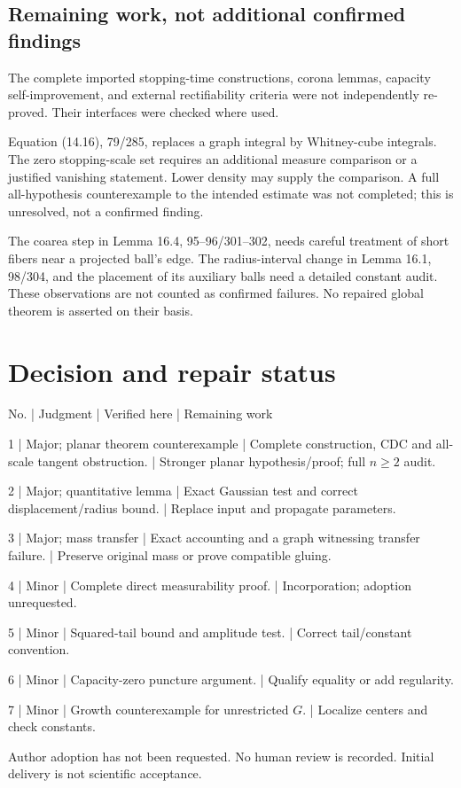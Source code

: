 \documentclass[10pt]{article}
\begin{document}
\subsection*{Remaining work, not additional confirmed findings}
The complete imported stopping-time constructions, corona lemmas, capacity self-improvement, and external rectifiability criteria were not independently re-proved. Their interfaces were checked where used.\par
Equation (14.16), 79/285, replaces a graph integral by Whitney-cube integrals. The zero stopping-scale set requires an additional measure comparison or a justified vanishing statement. Lower density may supply the comparison. A full all-hypothesis counterexample to the intended estimate was not completed; this is unresolved, not a confirmed finding.\par
The coarea step in Lemma 16.4, 95–96/301–302, needs careful treatment of short fibers near a projected ball’s edge. The radius-interval change in Lemma 16.1, 98/304, and the placement of its auxiliary balls need a detailed constant audit. These observations are not counted as confirmed failures. No repaired global theorem is asserted on their basis.\par
\section*{Decision and repair status}
No. | Judgment | Verified here | Remaining work\par
1 | Major; planar theorem counterexample | Complete construction, CDC and all-scale tangent obstruction. | Stronger planar hypothesis/proof; full \(n\ge2\) audit.\par
2 | Major; quantitative lemma | Exact Gaussian test and correct displacement/radius bound. | Replace input and propagate parameters.\par
3 | Major; mass transfer | Exact accounting and a graph witnessing transfer failure. | Preserve original mass or prove compatible gluing.\par
4 | Minor | Complete direct measurability proof. | Incorporation; adoption unrequested.\par
5 | Minor | Squared-tail bound and amplitude test. | Correct tail/constant convention.\par
6 | Minor | Capacity-zero puncture argument. | Qualify equality or add regularity.\par
7 | Minor | Growth counterexample for unrestricted \(G\). | Localize centers and check constants.\par
Author adoption has not been requested. No human review is recorded. Initial delivery is not scientific acceptance.\par
\end{document}
